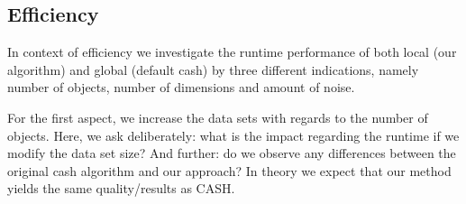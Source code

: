 \subsection{Efficiency}
In context of efficiency we investigate the runtime performance of both local (our algorithm) and global (default \gls{cash}) by three different indications, namely number of objects, number of dimensions and amount of noise.

For the first aspect, we increase the data sets with regards to the number of objects. Here, we ask deliberately: what is the impact regarding the runtime if we modify the data set size?
And further: do we observe any differences between the original \gls{cash} algorithm and our approach? In theory we expect that our method yields the same quality/results as CASH.

 
